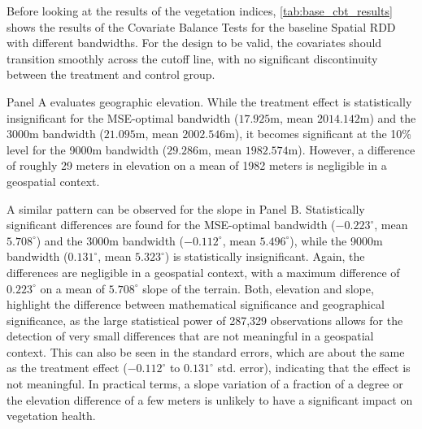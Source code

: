 \begin{customtable}
        \caption{Covariate Balance Tests for Baseline Model}
        \label{tab:base_cbt_results}
        \setlength{\tabcolsep}{15pt}

    \end{customtable}

Before looking at the results of the vegetation indices, \cref{tab:base_cbt_results} shows the results of the Covariate Balance Tests for the baseline Spatial RDD with different bandwidths.
For the design to be valid, the covariates should transition smoothly across the cutoff line, with no significant discontinuity between the treatment and control group.

Panel A evaluates geographic elevation. While the treatment effect is statistically insignificant for the MSE-optimal bandwidth ($17.925$m, mean $2014.142$m) and the 3000m bandwidth ($21.095$m, mean $2002.546$m), it becomes significant at the 10\% level for the 9000m bandwidth ($29.286$m, mean $1982.574$m).
However, a difference of roughly 29 meters in elevation on a mean of 1982 meters is negligible in a geospatial context.

A similar pattern can be observed for the slope in Panel B. Statistically significant differences are found for the MSE-optimal bandwidth ($-0.223^\circ$, mean $5.708^\circ$) and the 3000m bandwidth ($-0.112^\circ$, mean $5.496^\circ$), while the 9000m bandwidth ($0.131^\circ$, mean $5.323^\circ$) is statistically insignificant.
Again, the differences are negligible in a geospatial context, with a maximum difference of $0.223^\circ$ on a mean of $5.708^\circ$ slope of the terrain.
Both, elevation and slope, highlight the difference between mathematical significance and geographical significance, as the large statistical power of 287,329 observations allows for the detection of very small differences that are not meaningful in a geospatial context.
This can also be seen in the standard errors, which are about the same as the treatment effect ($-0.112^\circ$ to $0.131^\circ$ std. error), indicating that the effect is not meaningful.
In practical terms, a slope variation of a fraction of a degree or the elevation difference of a few meters is unlikely to have a significant impact on vegetation health.

